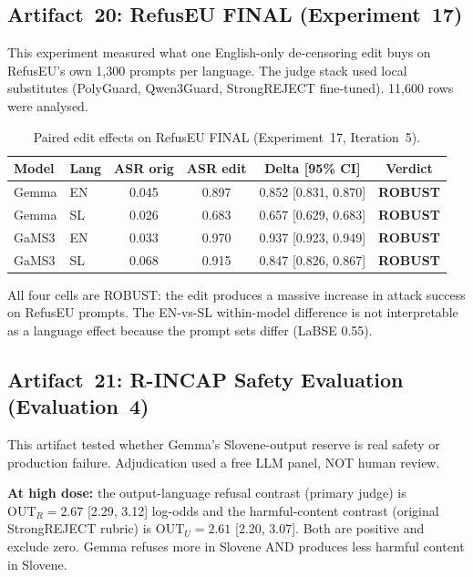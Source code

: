 \documentclass[11pt,letterpaper]{article}
\begin{document}
\subsection{Artifact~20: RefusEU FINAL (Experiment~17)}
\label{gen_art_experiment_17}

This experiment measured what one English-only de-censoring edit buys on RefusEU's own 1,300 prompts per language. The judge stack used local substitutes (PolyGuard, Qwen3Guard, StrongREJECT fine-tuned). 11,600 rows were analysed.

\begin{table}[!htbp]
\centering
\caption{Paired edit effects on RefusEU FINAL (Experiment~17, Iteration~5).}
\label{tab:refuseu_final_exp17}
\begin{tabular}{llcccc}
\toprule
Model & Lang & ASR orig & ASR edit & Delta [95\% CI] & Verdict \\
\midrule
Gemma & EN & 0.045 & 0.897 & 0.852 [0.831, 0.870] & \textbf{ROBUST} \\
Gemma & SL & 0.026 & 0.683 & 0.657 [0.629, 0.683] & \textbf{ROBUST} \\
GaMS3 & EN & 0.033 & 0.970 & 0.937 [0.923, 0.949] & \textbf{ROBUST} \\
GaMS3 & SL & 0.068 & 0.915 & 0.847 [0.826, 0.867] & \textbf{ROBUST} \\
\bottomrule
\end{tabular}
\end{table}

All four cells are ROBUST: the edit produces a massive increase in attack success on RefusEU prompts. The EN-vs-SL within-model difference is not interpretable as a language effect because the prompt sets differ (LaBSE 0.55).


\subsection{Artifact~21: R-INCAP Safety Evaluation (Evaluation~4)}
\label{gen_art_evaluation_4}

This artifact tested whether Gemma's Slovene-output reserve is real safety or production failure. Adjudication used a free LLM panel, NOT human review.

\textbf{At high dose:} the output-language refusal contrast (primary judge) is $\text{OUT}_R = 2.67$ [2.29, 3.12] log-odds and the harmful-content contrast (original StrongREJECT rubric) is $\text{OUT}_U = 2.61$ [2.20, 3.07]. Both are positive and exclude zero. Gemma refuses more in Slovene AND produces less harmful content in Slovene.
\end{document}
